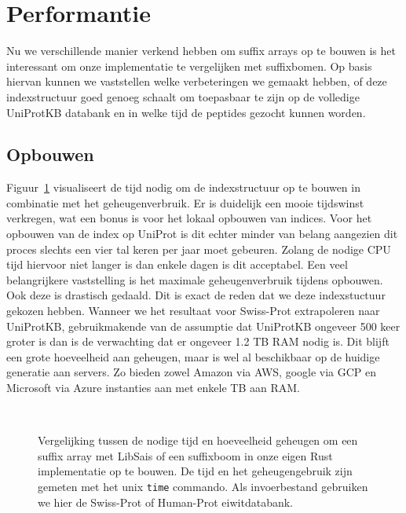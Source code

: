 \section{Performantie}\label{sec:performantie}
Nu we verschillende manier verkend hebben om suffix arrays op te bouwen is het interessant om onze implementatie te vergelijken met suffixbomen.
Op basis hiervan kunnen we vaststellen welke verbeteringen we gemaakt hebben, of deze indexstructuur goed genoeg schaalt om toepasbaar te zijn op de volledige UniProtKB databank en in welke tijd de peptides gezocht kunnen worden.

\subsection{Opbouwen}
Figuur~\ref{fig:array_building} visualiseert de tijd nodig om de indexstructuur op te bouwen in combinatie met het geheugenverbruik.
Er is duidelijk een mooie tijdswinst verkregen, wat een bonus is voor het lokaal opbouwen van indices.
Voor het opbouwen van de index op UniProt is dit echter minder van belang aangezien dit proces slechts een vier tal keren per jaar moet gebeuren.
Zolang de nodige CPU tijd hiervoor niet langer is dan enkele dagen is dit acceptabel.
Een veel belangrijkere vaststelling is het maximale geheugenverbruik tijdens opbouwen.
Ook deze is drastisch gedaald.
Dit is exact de reden dat we deze indexstuctuur gekozen hebben.
Wanneer we het resultaat voor Swiss-Prot extrapoleren naar UniProtKB, gebruikmakende van de assumptie dat UniProtKB ongeveer 500 keer groter is dan is de verwachting dat er ongeveer 1.2 TB RAM nodig is.
Dit blijft een grote hoeveelheid aan geheugen, maar is wel al beschikbaar op de huidige generatie aan servers.
Zo bieden zowel Amazon via AWS, google via GCP en Microsoft via Azure instanties aan met enkele TB aan RAM\@.

\begin{figure}[H]
    \centering
    \\[4ex] %

    \caption{Vergelijking tussen de nodige tijd en hoeveelheid geheugen om een suffix array met LibSais of een suffixboom in onze eigen Rust implementatie op te bouwen. De tijd en het geheugengebruik zijn gemeten met het unix \texttt{time} commando. Als invoerbestand gebruiken we hier de Swiss-Prot of Human-Prot eiwitdatabank.}\label{fig:array_building}
\end{figure}

